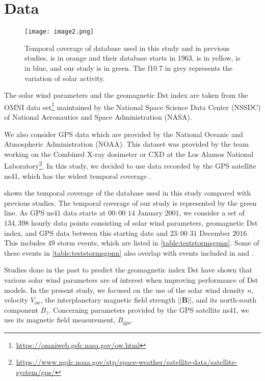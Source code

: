 \section{Data}\label{sec:datagpnn}

\begin{figure}
	\texttt{[image: image2.png]}
	\caption{Temporal coverage of database used in this study and in previous studies. \citet{wu1997geomagnetic} 
	is in orange and their database starts in 1963, \citet{Bala2012} is in yellow, \citet{Lazzus} is in blue, and our study is in green. 
	The f10.7 in grey represents the variation of solar activity.}
	\label{fig:datacoverage}
\end{figure}


The solar wind parameters and the geomagnetic Dst index are taken from the OMNI data 
set\footnote{\url{https://omniweb.gsfc.nasa.gov/ow.html}} maintained by the National Space Science 
Data Center (NSSDC) of National Aeronautics and Space Administration (NASA).

We also consider GPS data which are provided by the National Oceanic and Atmospheric Administration 
(NOAA). This dataset was provided by the team working on the Combined X-ray dosimeter or CXD at the 
Los Alamos National 
Laboratory\footnote{
	\url{https://www.ngdc.noaa.gov/stp/space-weather/satellite-data/satellite-system/gps/}
}. 
In this study, we decided to use data recorded by the GPS satellite ns41, which has the widest 
temporal coverage \citep{morley2017energetic}. 

 shows the temporal coverage of the database used in this study compared 
with previous studies. The temporal coverage of our study is represented by the green line. As GPS 
ns41 data starts at $00:00$ $14$ January $2001$, we consider a set of $134,398$ hourly data points 
consisting of solar wind parameters, geomagnetic Dst index, and GPS data between this starting 
date and $23:00$ $31$ December $2016$. This includes $49$ storm events, which are listed in 
\cref{table:teststormsgpnn}. Some of these events in \cref{table:teststormsgpnn} also overlap with 
events included in \citet{Ji2012} and \citet{ChandorkarDst}. 

Studies done in the past to predict the geomagnetic index Dst have shown that various solar wind 
parameters are of interest when improving performance of Dst models. In the present study, we 
focused on the use of the solar wind density $n$, velocity $V_{\text{sw}}$, the interplanetary 
magnetic field strength $\rvert\rvert\mathbf{B}\rvert\rvert$, and its north-south component 
$B_{z}$. Concerning parameters provided by the GPS satellite ns41, we use its magnetic field
measurement, $B_{\text{gps}}$.

